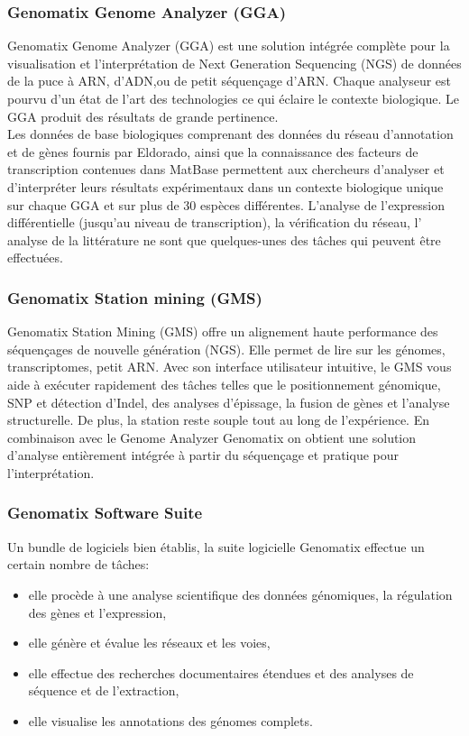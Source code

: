 \subsubsection{Genomatix Genome Analyzer (GGA)}
Genomatix Genome Analyzer (GGA) est une solution intégrée complète pour la visualisation et l'interprétation de Next Generation Sequencing (NGS) de données de la puce à ARN, d'ADN,ou de petit séquençage d'ARN. Chaque analyseur est pourvu d'un état de l'art des technologies ce qui éclaire le contexte biologique. Le GGA produit des résultats de grande pertinence.\\
Les données de base biologiques comprenant des données du réseau d'annotation et de gènes fournis par Eldorado, ainsi que la connaissance des facteurs de transcription contenues dans MatBase permettent aux chercheurs d'analyser et d'interpréter leurs résultats expérimentaux dans un contexte biologique unique sur chaque GGA et sur plus de 30 espèces différentes. L'analyse de l'expression différentielle (jusqu'au niveau de transcription), la vérification du réseau, l' analyse de la littérature ne sont que quelques-unes des tâches qui peuvent être effectuées.
\subsubsection{Genomatix Station mining (GMS)}
Genomatix Station Mining (GMS) offre un alignement haute performance des séquençages de nouvelle génération (NGS). 
Elle permet de lire sur les génomes, transcriptomes, petit ARN. Avec son interface utilisateur intuitive, le GMS vous aide à exécuter rapidement des tâches telles que le positionnement génomique, SNP et détection d'Indel, des analyses d'épissage, la fusion de gènes et l'analyse structurelle. De plus, la station reste souple tout au long de l'expérience. En combinaison avec le Genome Analyzer Genomatix on obtient une solution d'analyse entièrement intégrée à partir du séquençage et pratique pour l'interprétation.
\subsubsection{Genomatix Software Suite}
Un bundle de logiciels bien établis, la suite logicielle Genomatix effectue un certain nombre de tâches:
\begin{itemize}
\item{elle procède à une analyse scientifique des données génomiques, la régulation des gènes et l'expression,}
\item{elle génère et évalue les réseaux et les voies,}
\item{elle effectue des recherches documentaires étendues et des analyses de séquence et de l'extraction,}
\item{elle visualise les annotations des génomes complets.}
\end{itemize}

